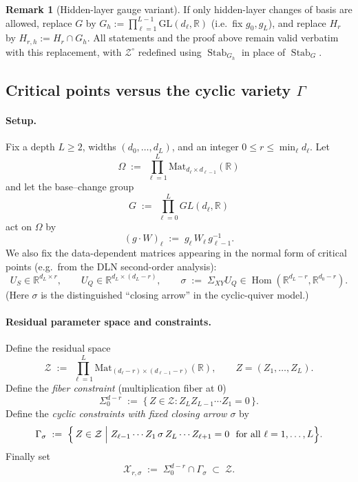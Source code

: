 \documentclass{article}
\newcommand{\Hom}{\operatorname{Hom}}
\newcommand{\R}{\mathbb{R}}
\newcommand{\Mat}{\mathrm{Mat}}
\theoremstyle{definition}
\newtheorem{remark}[theorem]{Remark}
\begin{document}
\begin{remark}[Hidden-layer gauge variant]
If only hidden-layer changes of basis are allowed, replace $G$ by $G_h := \prod_{\ell=1}^{L-1} \mathrm{GL}(d_\ell, \mathbb{R})$ (i.e.\ fix $g_0, g_L$), and replace $H_r$ by $H_{r,h} := H_r \cap G_h$. All statements and the proof above remain valid verbatim with this replacement, with $\mathcal{Z}^{\circ}$ redefined using $\operatorname{Stab}_{G_h}$ in place of $\operatorname{Stab}_G$.
\end{remark}

\subsection{Critical points versus the cyclic variety $\Gamma$}

\paragraph{Setup.}
Fix a depth $L\ge 2$, widths $(d_0,\dots,d_L)$, and an integer $0\le r\le \min_\ell d_\ell$.
Let
\[
\Omega \;:=\; \prod_{\ell=1}^L \Mat_{d_\ell\times d_{\ell-1}}(\R)
\]
and let the base--change group
\[
G \;:=\; \prod_{\ell=0}^L GL(d_\ell,\R)
\]
act on $\Omega$ by
\begin{equation}\label{eq:gauge-action-crit}
(g\cdot W)_\ell \;:=\; g_\ell\, W_\ell\, g_{\ell-1}^{-1}.
\end{equation}
We also fix the data-dependent matrices appearing in the normal form of critical points (e.g.\ from the DLN second-order analysis):
\[
U_S\in \R^{d_L\times r},\qquad U_Q\in \R^{d_L\times(d_L-r)},\qquad
\sigma \;:=\; \Sigma_{XY}U_Q \in \Hom(\R^{d_L-r},\R^{d_0-r}).
\]
(Here $\sigma$ is the distinguished ``closing arrow'' in the cyclic-quiver model.)

\paragraph{Residual parameter space and constraints.}
Define the residual space
\[
\mathcal Z \;:=\; \prod_{\ell=1}^L \Mat_{(d_\ell-r)\times(d_{\ell-1}-r)}(\R),
\qquad Z=(Z_1,\dots,Z_L).
\]
Define the \emph{fiber constraint} (multiplication fiber at $0$)
\begin{equation}\label{eq:Sigma0-dr}
\Sigma^{d-r}_0 \;:=\; \{\,Z\in \mathcal Z : Z_L Z_{L-1}\cdots Z_1 = 0\,\}.
\end{equation}
Define the \emph{cyclic constraints with fixed closing arrow $\sigma$} by
\begin{equation}\label{eq:Gamma-sigma}
\Gamma_\sigma \;:=\;
\Bigl\{\,Z\in\mathcal Z \;\Big|\;
Z_{\ell-1}\cdots Z_1\,\sigma\, Z_L\cdots Z_{\ell+1}=0\ \text{ for all }\ell=1,\dots,L
\Bigr\}.
\end{equation}
Finally set
\begin{equation}\label{eq:X-def}
\mathcal X_{r,\sigma} \;:=\; \Sigma^{d-r}_0 \cap \Gamma_\sigma \;\subset\; \mathcal Z.
\end{equation}
\end{document}
